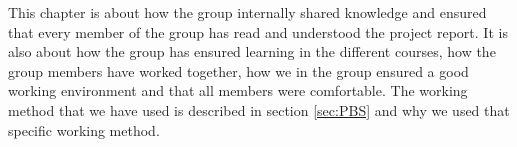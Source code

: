 This chapter is about how the group internally shared knowledge and ensured that every member of the group has read and understood the project report. It is also about how the group has ensured learning in the different courses, how the group members have worked together, how we in the group ensured a good working environment and that all members were comfortable. The working method that we have used is described in section \ref{sec:PBS} and why we used that specific working method.